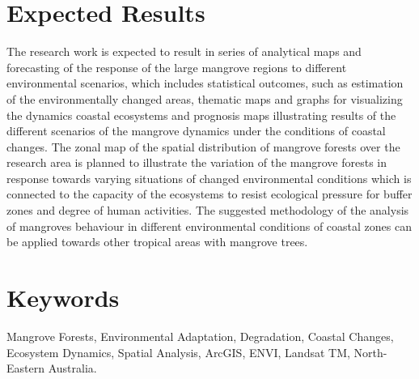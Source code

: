 \documentclass[11pt]{paper}
\begin{document}
\section{Expected Results}
The research work is expected to result in series of analytical maps and forecasting of the response of the large mangrove regions to different environmental scenarios, which includes statistical outcomes, such as estimation of the environmentally changed areas, thematic maps and graphs for visualizing the dynamics coastal ecosystems and prognosis maps illustrating results of the different scenarios of the mangrove dynamics under the conditions of coastal changes. The zonal map of the spatial distribution of mangrove forests over the research area is planned to illustrate the variation of the mangrove forests in response towards varying situations of changed environmental conditions which is connected to the capacity of the ecosystems to resist ecological pressure for buffer zones and degree of human activities. The suggested methodology of the analysis of mangroves behaviour in different environmental conditions of coastal zones can be applied towards other tropical areas with mangrove trees.

\section{Keywords}
Mangrove Forests, Environmental Adaptation, Degradation, Coastal Changes, Ecosystem Dynamics, Spatial Analysis, ArcGIS, ENVI, Landsat TM, North-Eastern Australia.
	
\end{document}
